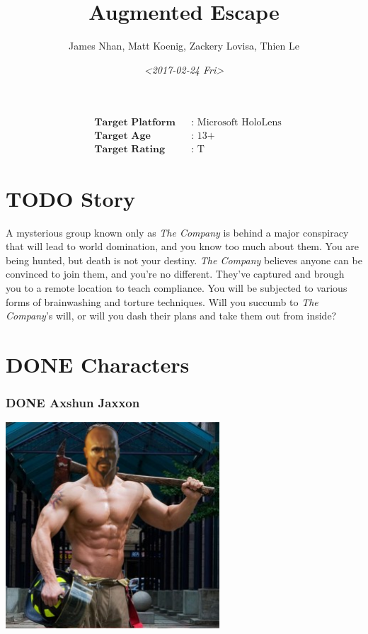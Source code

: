 \documentclass[11pt]{article}
\author{James Nhan, Matt Koenig, Zackery Lovisa, Thien Le}
\date{\textit{<2017-02-24 Fri>}}
\title{Augmented Escape}
\begin{document}
\maketitle
\begin{align*}
   &\textbf{Target Platform}&&\text{: Microsoft HoloLens} \\
   &\textbf{Target Age}&&\text{: 13+} \\
   &\textbf{Target Rating}&&\text{: T}
\end{align*}

\pagebreak

\tableofcontents

\pagebreak

\section{{\bfseries\sffamily TODO} Story}
\label{sec:orga79e8c8}
A mysterious group known only as \emph{The Company} is behind a major conspiracy that will lead to world domination, and you know too much about them. You are being hunted, but death is not your destiny. \emph{The Company} believes anyone can be convinced to join them, and you're no different. They've captured and brough you to a remote location to teach compliance. You will be subjected to various forms of brainwashing and torture techniques. Will you succumb to \emph{The Company}'s will, or will you dash their plans and take them out from inside?

\section{{\bfseries\sffamily DONE} Characters}
\label{sec:orgf98313c}
\subsubsection{{\bfseries\sffamily DONE} Axshun Jaxxon}
\label{sec:org3f61984}
\begin{center}
\includegraphics[width=8cm]{./img/axshun-jaxxon.png}
\end{center}
\end{document}
